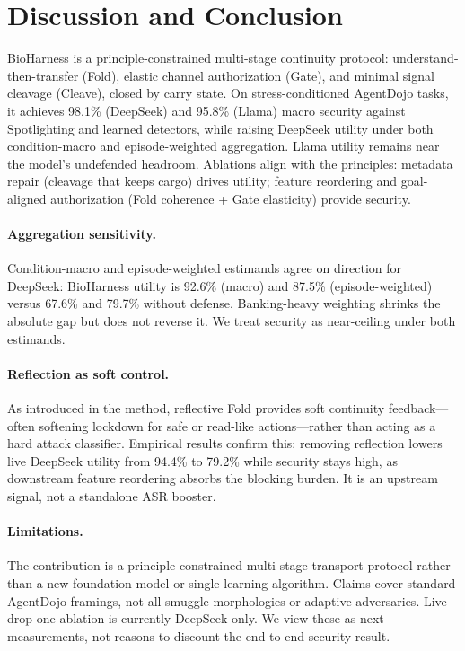 \section{Discussion and Conclusion}
\label{sec:discussion}

BioHarness is a principle-constrained multi-stage continuity protocol: understand-then-transfer (Fold), elastic channel authorization (Gate), and minimal signal cleavage (Cleave), closed by carry state. On stress-conditioned AgentDojo tasks, it achieves 98.1\% (DeepSeek) and 95.8\% (Llama) macro security against Spotlighting and learned detectors, while raising DeepSeek utility under both condition-macro and episode-weighted aggregation. Llama utility remains near the model's undefended headroom. Ablations align with the principles: metadata repair (cleavage that keeps cargo) drives utility; feature reordering and goal-aligned authorization (Fold coherence + Gate elasticity) provide security.

\paragraph{Aggregation sensitivity.}
Condition-macro and episode-weighted estimands agree on direction for DeepSeek: BioHarness utility is 92.6\% (macro) and 87.5\% (episode-weighted) versus 67.6\% and 79.7\% without defense. Banking-heavy weighting shrinks the absolute gap but does not reverse it. We treat security as near-ceiling under both estimands.

\paragraph{Reflection as soft control.}
As introduced in the method, reflective Fold provides soft continuity feedback---often softening lockdown for safe or read-like actions---rather than acting as a hard attack classifier. Empirical results confirm this: removing reflection lowers live DeepSeek utility from 94.4\% to 79.2\% while security stays high, as downstream feature reordering absorbs the blocking burden. It is an upstream signal, not a standalone ASR booster.

\paragraph{Limitations.}
The contribution is a principle-constrained multi-stage transport protocol rather than a new foundation model or single learning algorithm. Claims cover standard AgentDojo framings, not all smuggle morphologies or adaptive adversaries. Live drop-one ablation is currently DeepSeek-only. We view these as next measurements, not reasons to discount the end-to-end security result.

